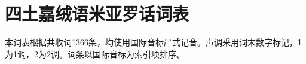 \providecommand{\ipa}[1]{#1}
\providecommand{\audioGlossIndex}[1]{}
\providecommand{\audioGlossGroup}[1]{%
  \par\medskip\noindent{\large\bfseries #1}\par\nopagebreak\vspace{0.15em}%
}
\providecommand{\audioGlossEntry}[2]{%
  \audioGlossIndex{#1}%
  \noindent\hangindent=2.6em\hangafter=1\textbf{\ipa{#1}}\quad #2\par%
}
\chapter{四土嘉绒语米亚罗话词表}
\noindent 本词表根据共收词1366条，均使用国际音标严式记音。声调采用词末数字标记，1为1调，2为2调。词条以国际音标为索引项排序。
\begingroup
\small
\setlength{\columnsep}{1.35em}
\setlength{\parindent}{0pt}
\setlength{\parskip}{0.08em}
